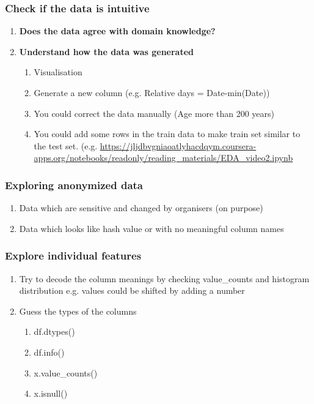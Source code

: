 \documentclass[11pt, twoside]{article}   	%
\begin{document}
\subsubsection{Check if the data is intuitive}
\renewcommand{\labelenumii}{\alph{enumii}}
\begin{enumerate}
  \item \textbf{Does the data agree with domain knowledge?}
  \item \textbf{Understand how the data was generated}
    \begin{enumerate}
      \item  Visualisation
      \item Generate a new column (e.g. Relative days = Date-min(Date))
      \item You could correct the data manually (Age more than 200 years)
      \item  You could add some rows in the train data to make train set similar to the test set. (e.g. \url{https://jljdbvgniaoatlyhacdqym.coursera-apps.org/notebooks/readonly/reading_materials/EDA_video2.ipynb}
      
    \end{enumerate}
  \end{enumerate}

\subsubsection{Exploring anonymized data} 

    \begin{enumerate}
      \item  Data which are sensitive and changed by organisers (on purpose) 
      \item  Data which looks like hash value or with no meaningful column names
    \end{enumerate}

\subsubsection{Explore individual features}
    \begin{enumerate}
      \item  Try to decode the column meanings by checking value\_counts and histogram distribution e.g. values could be shifted by adding a number
      \item  Guess the types of the columns 
          \begin{enumerate}
           \item df.dtypes()
            \item df.info()
             \item x.value\_counts()
              \item x.isnull()
    \end{enumerate}
  \end{enumerate}
     
\end{document}
